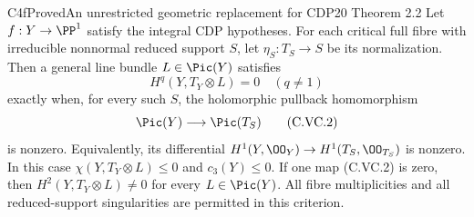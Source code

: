 \begin{statement}{C4f}{Proved}{An unrestricted geometric replacement for CDP20 Theorem 2.2}
Let $f:Y\to\PP^1$ satisfy the integral CDP hypotheses.
For each critical full fibre with
irreducible nonnormal reduced support $S$, let
$\eta_S:T_S\to S$ be its normalization. Then a general
line bundle $L\in\Pic(Y)$ satisfies
\[
 H^q(Y,T_Y\otimes L)=0\quad(q\ne1)
 \tag{C.VC.1}
\]
exactly when, for every such $S$, the holomorphic pullback
homomorphism
\[
 \Pic(Y)\longrightarrow\Pic(T_S)
 \tag{C.VC.2}
\]
is nonzero. Equivalently, its differential
$H^1(Y,\OO_Y)\to H^1(T_S,\OO_{T_S})$ is nonzero.
In this case $\chi(Y,T_Y\otimes L)\le0$ and $c_3(Y)\le0$.
If one map (C.VC.2) is zero, then
$H^2(Y,T_Y\otimes L)\ne0$ for every $L\in\Pic(Y)$.
All fibre multiplicities and all reduced-support
singularities are permitted in this criterion.
\end{statement}
